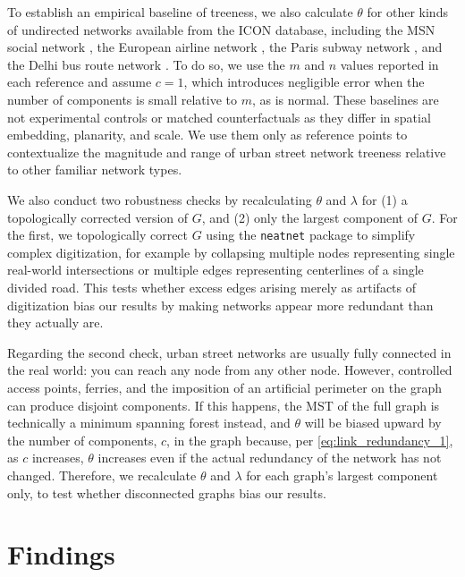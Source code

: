 \documentclass[12pt,letterpaper]{article} %
\begin{document}
To establish an empirical baseline of treeness, we also calculate $\theta$ for other kinds of undirected networks available from the ICON database, including the MSN social network \citep{leskovec_planetary-scale_2008}, the European airline network \citep{cardillo_emergence_2013}, the Paris subway network \citep{roth_long-time_2012}, and the Delhi bus route network \citep{chatterjee_statistical_2016}. To do so, we use the $m$ and $n$ values reported in each reference and assume $c=1$, which introduces negligible error when the number of components is small relative to $m$, as is normal. These baselines are not experimental controls or matched counterfactuals as they differ in spatial embedding, planarity, and scale. We use them only as reference points to contextualize the magnitude and range of urban street network treeness relative to other familiar network types.

We also conduct two robustness checks by recalculating $\theta$ and $\lambda$ for (1) a topologically corrected version of $G$, and (2) only the largest component of $G$. For the first, we topologically correct $G$ using the \texttt{neatnet} package \citep{fleischmann_adaptive_2026} to simplify complex digitization, for example by collapsing multiple nodes representing single real-world intersections or multiple edges representing centerlines of a single divided road. This tests whether excess edges arising merely as artifacts of digitization bias our results by making networks appear more redundant than they actually are.

Regarding the second check, urban street networks are usually fully connected in the real world: you can reach any node from any other node. However, controlled access points, ferries, and the imposition of an artificial perimeter on the graph can produce disjoint components. If this happens, the MST of the full graph is technically a minimum spanning forest instead, and $\theta$ will be biased upward by the number of components, $c$, in the graph because, per \autoref{eq:link_redundancy_1}, as $c$ increases, $\theta$ increases even if the actual redundancy of the network has not changed. Therefore, we recalculate $\theta$ and $\lambda$ for each graph's largest component only, to test whether disconnected graphs bias our results.

\section{Findings}
\end{document}
